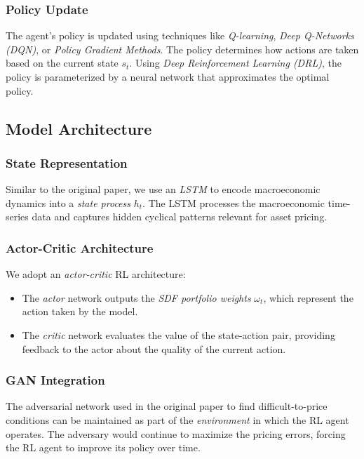\subsubsection{Policy Update}
The agent's policy is updated using techniques like \textit{Q-learning}, \textit{Deep Q-Networks (DQN)}, or \textit{Policy Gradient Methods}. The policy determines how actions are taken based on the current state $s_t$. Using \textit{Deep Reinforcement Learning (DRL)}, the policy is parameterized by a neural network that approximates the optimal policy.

\subsection{Model Architecture}

\subsubsection{State Representation}
Similar to the original paper, we use an \textit{LSTM} to encode macroeconomic dynamics into a \textit{state process} $h_t$. The LSTM processes the macroeconomic time-series data and captures hidden cyclical patterns relevant for asset pricing.

\subsubsection{Actor-Critic Architecture}
We adopt an \textit{actor-critic} RL architecture:
\begin{itemize}
    \item The \textit{actor} network outputs the \textit{SDF portfolio weights} $\omega_t$, which represent the action taken by the model.
    \item The \textit{critic} network evaluates the value of the state-action pair, providing feedback to the actor about the quality of the current action.
\end{itemize}

\subsubsection{GAN Integration}
The adversarial network used in the original paper to find difficult-to-price conditions can be maintained as part of the \textit{environment} in which the RL agent operates. The adversary would continue to maximize the pricing errors, forcing the RL agent to improve its policy over time.

